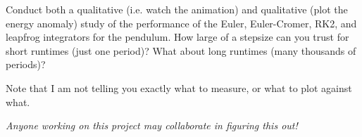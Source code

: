 \documentclass[12pt]{article}
\begin{document}
\begin{enumerate}
Conduct both a qualitative (i.e. watch the animation) and qualitative (plot the energy anomaly) study of the performance of the Euler, Euler-Cromer, RK2, and leapfrog
integrators for the pendulum. How large of a stepsize can you trust for short runtimes (just one period)? What about long runtimes (many thousands of periods)?

Note that I am not telling you exactly what to measure, or what to plot against what.

{\it Anyone working on this project may collaborate in figuring this out!}


\end{enumerate}
\end{document}
